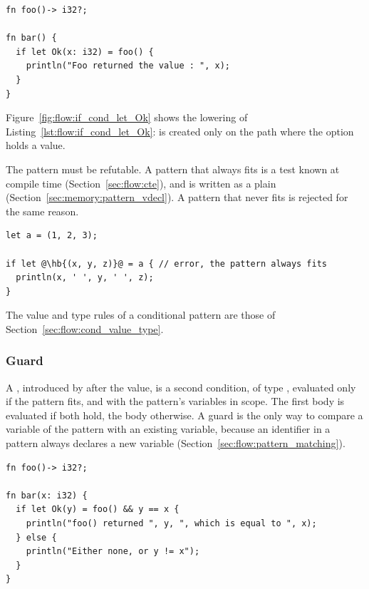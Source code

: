 

\begin{lstlisting}[style=coloredverbatim, label=lst:flow:if_cond_let_Ok, caption=Example of conditional pattern]
fn foo()-> i32?;

fn bar() {
  if let Ok(x: i32) = foo() {
    println("Foo returned the value : ", x);
  }
}
\end{lstlisting}

Figure~\ref{fig:flow:if_cond_let_Ok} shows the lowering of
Listing~\ref{lst:flow:if_cond_let_Ok}:  is created only on the path
where the option holds a value.

The pattern must be refutable. A pattern that always fits is a test known at
compile time (Section~\ref{sec:flow:cte}), and is written as a plain 
(Section~\ref{sec:memory:pattern_vdecl}). A pattern that never fits is rejected
for the same reason.

\begin{lstlisting}[style=coloredverbatimError, escapechar=@]
let a = (1, 2, 3);

if let @\hb{(x, y, z)}@ = a { // error, the pattern always fits
  println(x, ' ', y, ' ', z);
}
\end{lstlisting}

The value and type rules of a conditional pattern are those of
Section~\ref{sec:flow:cond_value_type}.

\subsubsection{Guard}

A , introduced by \token{\&\&} after the value, is a second
condition, of type , evaluated only if the pattern fits, and with
the pattern's variables in scope. The first body is evaluated if both hold, the
 body otherwise. A guard is the only way to compare a variable of the
pattern with an existing variable, because an identifier in a pattern always
declares a new variable (Section~\ref{sec:flow:pattern_matching}).

\begin{lstlisting}[style=coloredverbatim, caption=Using a pattern guard]
fn foo()-> i32?;

fn bar(x: i32) {
  if let Ok(y) = foo() && y == x {
    println("foo() returned ", y, ", which is equal to ", x);
  } else {
    println("Either none, or y != x");
  }
}
\end{lstlisting}

